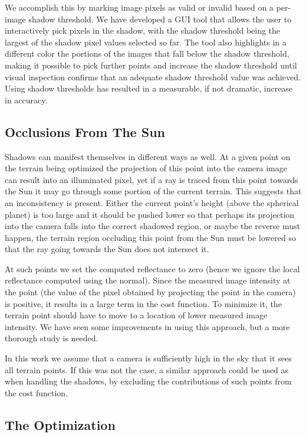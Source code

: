 \documentclass[12pt,oneside]{article}
\begin{document}
We accomplish this by marking image pixels as valid or invalid based on
a per-image shadow threshold. We have developed a GUI tool that allows
the user to interactively pick pixels in the shadow, with the shadow
threshold being the largest of the shadow pixel values selected so
far. The tool also highlights in a different color the portions of the
images that fall below the shadow threshold, making it possible to pick
further points and increase the shadow threshold until visual inspection
confirms that an adequate shadow threshold value was achieved. Using
shadow thresholds has resulted in a measurable, if not dramatic,
increase in accuracy.

\subsection{Occlusions From The Sun}

Shadows can manifest themselves in different ways as well. At a given
point on the terrain being optimized the projection of this point into
the camera image can result into an illuminated pixel, yet if a ray is
traced from this point towards the Sun it may go through some portion of
the current terrain. This suggests that an inconsistency is
present. Either the current point's height (above the spherical planet)
is too large and it should be pushed lower so that perhaps its
projection into the camera falls into the correct shadowed region, or
maybe the reverse must happen, the terrain region occluding this point
from the Sun must be lowered so that the ray going towards the Sun does not
intersect it. 

At such points we set the computed reflectance to zero (hence we ignore
the local reflectance computed using the normal). Since the measured
image intensity at the point (the value of the pixel obtained by
projecting the point in the camera) is positive, it results in a large
term in the cost function. To minimize it, the terrain point should have
to move to a location of lower measured image intensity. We have seen
some improvements in using this approach, but a more thorough study is
needed.

In this work we assume that a camera is sufficiently high in the sky
that it sees all terrain points. If this was not the case, a similar
approach could be used as when handling the shadows, by excluding the
contributions of such points from the cost function.

\subsection{The Optimization}
\end{document}
